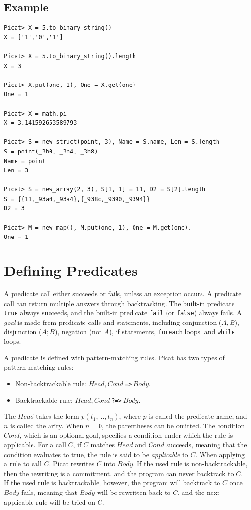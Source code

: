\subsection*{Example}
\begin{verbatim}
Picat> X = 5.to_binary_string()
X = ['1','0','1']

Picat> X = 5.to_binary_string().length
X = 3

Picat> X.put(one, 1), One = X.get(one)
One = 1

Picat> X = math.pi
X = 3.141592653589793

Picat> S = new_struct(point, 3), Name = S.name, Len = S.length
S = point(_3b0, _3b4, _3b8)
Name = point
Len = 3

Picat> S = new_array(2, 3), S[1, 1] = 11, D2 = S[2].length
S = {{11,_93a0,_93a4},{_938c,_9390,_9394}}
D2 = 3

Picat> M = new_map(), M.put(one, 1), One = M.get(one).
One = 1
\end{verbatim}

\section{Defining Predicates}
A predicate  call either succeeds or fails, unless an exception occurs. A predicate call can return multiple answers through backtracking. The built-in predicate \texttt{true} always succeeds, and the built-in predicate \texttt{fail} (or \texttt{false}) always fails. A \emph{goal} is made from predicate calls and statements, including conjunction ($A, B$), disjunction ($A;B$), negation (not $A$), if statements, \texttt{foreach} loops, and \texttt{while} loops.

A predicate is defined with pattern-matching rules. Picat has two types of pattern-matching rules:
\begin{itemize}
\item Non-backtrackable rule: $Head, Cond\ $\verb+=>+$\ Body$.
\item Backtrackable rule: $Head, Cond\ $\verb+?=>+$\ Body$.
\end{itemize}
The $Head$ takes the form $p(t_1, \ldots, t_n)$, where $p$ is called the predicate name, and $n$ is called the arity. When $n = 0$, the parentheses can be omitted. The condition $Cond$, which is an optional goal, specifies a condition under which the rule is applicable. For a call $C$, if $C$ matches $Head$ and $Cond$ succeeds, meaning that the condition evaluates to true, the rule is said to be \emph{applicable} to $C$. When applying a rule to call $C$, Picat rewrites $C$ into $Body$. If the used rule is non-backtrackable, then the rewriting is a commitment, and the program can never backtrack to $C$. If the used rule is backtrackable, however, the program will backtrack to $C$ once $Body$ fails, meaning that $Body$ will be rewritten back to $C$, and the next applicable rule will be tried on $C$. 


